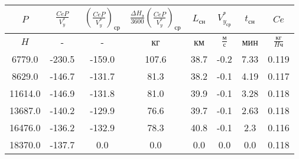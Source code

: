 \begin{tabular}{|c|c|c|c|c|c|c|c|}
\hline
$P$ & $\frac{CeP}{V_y^*}$ & $(\frac{CeP}{V_y^*})_{ср}$ & $\frac{\Delta H_э}{3600}(\frac{CeP}{V_y^*})_{ср}$ & $L_{сн}$ & $V_{y_{ср}}^*$ & $t_{сн}$ & $Ce$ \\ 
\hline
$H$ & - & - & кг & км & $\frac{м}{с}$ & мин & $\frac{кг}{H ч}$ \\ 
\hline
6779.0 & -230.5 & -159.0 & 107.6 & 38.7 & -0.2 & 7.33 & 0.119 \\ 
\hline
8629.0 & -146.7 & -131.7 & 81.3 & 38.2 & -0.1 & 4.19 & 0.117 \\ 
\hline
11614.0 & -146.9 & -131.8 & 81.0 & 39.9 & -0.1 & 3.28 & 0.118 \\ 
\hline
13687.0 & -140.2 & -129.9 & 76.6 & 39.7 & -0.1 & 2.63 & 0.118 \\ 
\hline
16476.0 & -136.2 & -132.9 & 78.3 & 40.8 & -0.1 & 2.3 & 0.116 \\ 
\hline
18370.0 & -137.7 & 0.0 & 0.0 & 0.0 & 0.0 & 0.0 & 0.118 \\ 
\hline
\end{tabular}